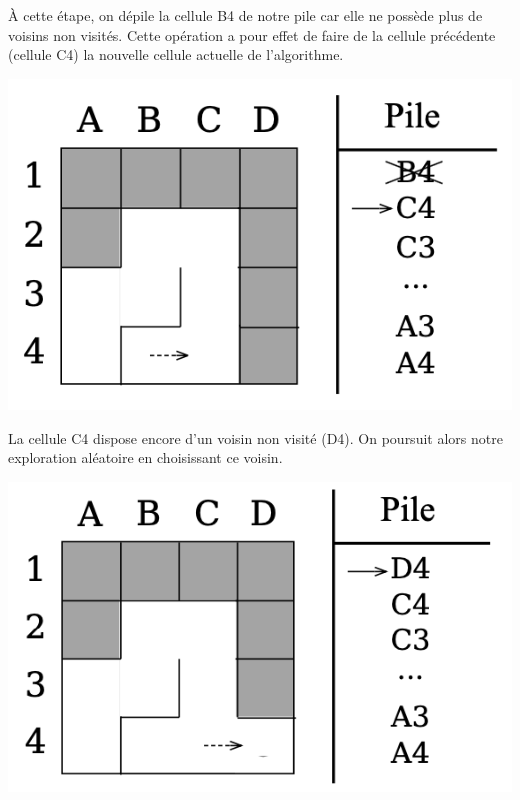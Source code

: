 \begin{minipage}{0.6\textwidth}
À cette étape, on dépile la cellule B4 de notre pile car elle ne possède plus de voisins non visités. Cette opération a pour effet de faire de la cellule précédente (cellule C4) la nouvelle cellule actuelle de l'algorithme.
\end{minipage}
\begin{minipage}{0.4\textwidth}
\includegraphics[width=\linewidth]{report/pics/backtracking5.png}
\end{minipage}

\begin{minipage}{0.6\textwidth}
La cellule C4 dispose encore d'un voisin non visité (D4). On poursuit alors notre exploration aléatoire en choisissant ce voisin.
\end{minipage}
\begin{minipage}{0.4\textwidth}
\includegraphics[width=\linewidth]{report/pics/backtracking6.png}
\end{minipage}

